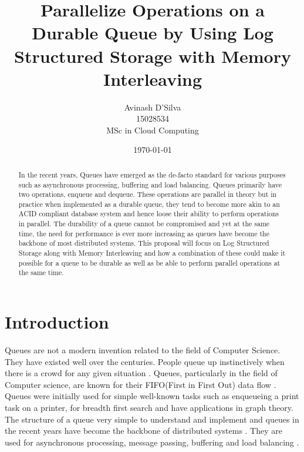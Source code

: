 \documentclass[12pt,a4paper]{article}
\begin{document}
\title{Parallelize Operations on a Durable Queue by Using Log Structured Storage with Memory Interleaving}%
\author{Avinash D'Silva \\ 15028534 \\ MSc in Cloud Computing}%
\date{\today}
\maketitle

\begin{abstract}
 In the recent years, Queues have emerged as the de-facto standard for various purposes such as asynchronous processing, buffering and load balancing. Queues primarily have two operations, enqueue and dequeue. These operations are parallel in theory but in practice when implemented as a durable queue, they tend to become more akin to an ACID compliant database system and hence loose their ability to perform operations in parallel. The durability of a queue cannot be compromised and yet at the same time, the need for performance is ever more increasing as queues have become the backbone of most distributed systems. This proposal will focus on Log Structured Storage along with Memory Interleaving and how a combination of these could make it possible for a queue to be durable as well as be able to perform parallel operations at the same time.
\end{abstract}

\tableofcontents

\section{Introduction}

Queues are not a modern invention related to the field of Computer Science. They have existed well over the centuries. People queue up instinctively when there is a crowd for any given situation \citep{spieser2008stabilizing}. Queues, particularly in the field of Computer science, are known for their FIFO(First in First Out) data flow \citep{maclaren1969art}. Queues were initially used for simple well-known tasks such as enqueueing a print task on a printer, for breadth first search and have applications in graph theory. \\

 The structure of a queue very simple to understand and implement and queues in the recent years have become the backbone of distributed systems \citep{lamport1978time}. They are used for asynchronous processing, message passing, buffering and load balancing \citep{lu2011join}. 
\end{document}
